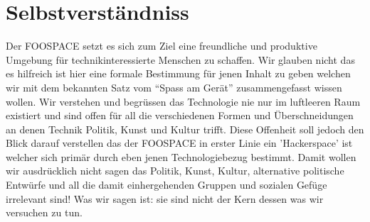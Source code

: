 \documentclass[10pt,a4paper]{article}
\begin{document}
\section*{Selbstverständniss}

Der FOOSPACE setzt es sich zum Ziel eine freundliche und produktive Umgebung
für technikinteressierte Menschen zu schaffen.  Wir glauben nicht das es
hilfreich ist hier eine formale Bestimmung für jenen Inhalt zu geben welchen
wir mit dem bekannten Satz vom "`Spass am Gerät"' zusammengefasst wissen wollen.
Wir verstehen und begrüssen das Technologie nie nur im luftleeren Raum
existiert und sind offen für all die verschiedenen Formen und Überschneidungen
an denen Technik Politik, Kunst und Kultur trifft.
Diese Offenheit soll jedoch den Blick darauf verstellen das der FOOSPACE in
erster Linie ein 'Hackerspace' ist welcher sich primär durch eben
jenen Technologiebezug bestimmt.  Damit wollen wir ausdrücklich nicht sagen das
Politik, Kunst, Kultur, alternative politische Entwürfe und all die damit
einhergehenden Gruppen und sozialen Gefüge irrelevant sind! Was wir sagen ist:
sie sind nicht der Kern dessen was wir versuchen zu tun.
\end{document}
